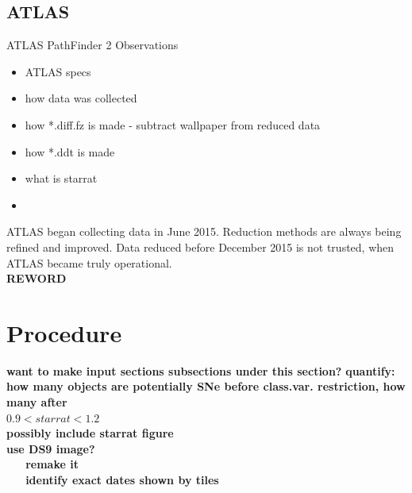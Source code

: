 \documentclass[aps,prb,twocolumn,superscriptaddress]{revtex4-1}
\begin{document}
\subsection{ATLAS}
ATLAS PathFinder 2 Observations
\begin{itemize}
	\item{} ATLAS specs
	\item{} how data was collected
	\item{} how *.diff.fz is made - subtract wallpaper from reduced data
	\item{} how *.ddt is made
	\item{} what is starrat
	\item{} \cite{ATLAS_data}
\end{itemize}

ATLAS began collecting data in June 2015. Reduction methods 
are always being refined and improved. Data reduced before 
December 2015 is not trusted, when ATLAS became truly operational.\\
{\bf REWORD}


\section{Procedure}
{\bf want to make input sections subsections under this section?}
{\bf quantify: how many objects are potentially SNe before class.var. restriction, how many after\\
$0.9 < starrat < 1.2$\\}
{\bf possibly include starrat figure\\
use DS9 image?\\
~~~remake it\\
~~~identify exact dates shown by tiles}
\end{document}
